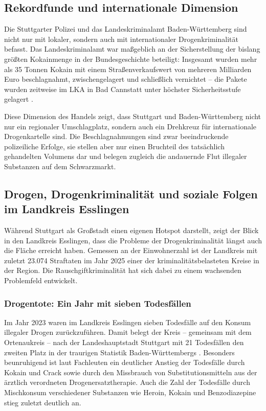 \documentclass[11pt,a4paper]{article}
\begin{document}
	\subsection{Rekordfunde und internationale Dimension}
	
	Die Stuttgarter Polizei und das Landeskriminalamt Baden-Württemberg sind nicht nur mit lokaler, sondern auch mit internationaler Drogenkriminalität befasst. Das Landeskriminalamt war maßgeblich an der Sicherstellung der bislang größten Kokainmenge in der Bundesgeschichte beteiligt: Insgesamt wurden mehr als 35 Tonnen Kokain mit einem Straßenverkaufswert von mehreren Milliarden Euro beschlagnahmt, zwischengelagert und schließlich vernichtet – die Pakete wurden zeitweise im LKA in Bad Cannstatt unter höchster Sicherheitsstufe gelagert \cite{kokainfund-lka}.
	
	Diese Dimension des Handels zeigt, dass Stuttgart und Baden-Württemberg nicht nur ein regionaler Umschlagplatz, sondern auch ein Drehkreuz für internationale Drogenkartelle sind. Die Beschlagnahmungen sind zwar beeindruckende polizeiliche Erfolge, sie stellen aber nur einen Bruchteil des tatsächlich gehandelten Volumens dar und belegen zugleich die andauernde Flut illegaler Substanzen auf dem Schwarzmarkt.
	
	\subsection{Drogen, Drogenkriminalität und soziale Folgen im Landkreis Esslingen}
	
	Während Stuttgart als Großstadt einen eigenen Hotspot darstellt, zeigt der Blick in den Landkreis Esslingen, dass die Probleme der Drogenkriminalität längst auch die Fläche erreicht haben. Gemessen an der Einwohnerzahl ist der Landkreis mit zuletzt 23.074 Straftaten im Jahr 2025 einer der kriminalitätsbelasteten Kreise in der Region. Die Rauschgiftkriminalität hat sich dabei zu einem wachsenden Problemfeld entwickelt.
	
	\subsubsection{Drogentote: Ein Jahr mit sieben Todesfällen}
	
	Im Jahr 2023 waren im Landkreis Esslingen sieben Todesfälle auf den Konsum illegaler Drogen zurückzuführen. Damit belegt der Kreis – gemeinsam mit dem Ortenaukreis – nach der Landeshauptstadt Stuttgart mit 21 Todesfällen den zweiten Platz in der traurigen Statistik Baden-Württembergs \cite{esslingen-drogentote}. Besonders beunruhigend ist laut Fachleuten ein deutlicher Anstieg der Todesfälle durch Kokain und Crack sowie durch den Missbrauch von Substitutionsmitteln aus der ärztlich verordneten Drogenersatztherapie. Auch die Zahl der Todesfälle durch Mischkonsum verschiedener Substanzen wie Heroin, Kokain und Benzodiazepine stieg zuletzt deutlich an.
	
\end{document}
